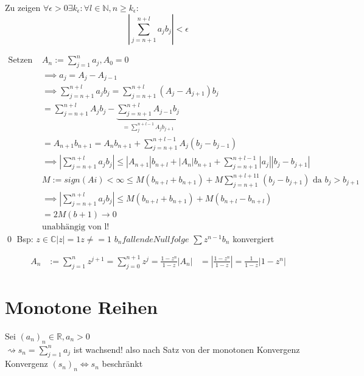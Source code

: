 \documentclass[fleqn]{scrbook}
\newcommand{\R}{\mathbb{R}}
\newcommand{\N}{\mathbb{N}}
\renewenvironment{proof}{{\bfseries Beweis }}{\qed}
\begin{document}
\begin{proof}
 Zu zeigen $\forall \epsilon > 0 \exists k_\epsilon: \forall l \in \N, n \ge k_\epsilon:$
 $$| \sum_{j=n+1}^{n+l} a_j b_j | < \epsilon$$
 
 \begin{equation}
  \begin{split}
    \text{Setzen } & A_n := \sum_{j=1}^{n}a_j, A_0 = 0 \\
    & \implies a_j = A_j - A_{j-1} \\
    & \implies \sum_{j=n+1}^{n+l}  a_j b_j = \sum_{j=n+1}^{n+l} (A_j - A_{j+1}) b_j \\
    & = \sum_{j=n+1}^{n+l}  A_j b_j - \underbrace{\sum_{j=n+1}^{n+l}  A_{j-1} b_j}_{= \sum_j^{n+l-1} A_j b_{j+1}} \\
    & = A_{n+1} b_{n+1} = A_n b_{n+1} + \sum_{j=n+1}^{n+l-1} A_j (b_j - b_{j-1}) \\
    & \implies | \sum_{j=n+1}^{n+l}  a_j b_j | \le | A_{n+1} | b_{n+l} + |A_n| b_{n+1} + \sum_{j=n+1}^{n+l-1} |a_j| |b_j - b_{j+1}|  \\
    & M := sign(Ai) < \infty \le M (b_{n+l} + b_{n+1}) + M \sum_{j=n+1}^{n+l+11} (b_j - b_{j+1})  \text{  da  } b_j > b_{j+1} \\
    & \implies |\sum_{j=n+1}^{n+l} a_j b_j| \le M(b_{n+l} + b_{n+1}) + M (b_{n+l} - b_{n+l}) \\
    & = 2 M(b+1) \to 0 \\
    & \text{unabhängig von l!}
  \end{split}
 \end{equation}
\end{proof}
Bsp: $z \in \mathbb{C} |z| = 1 z \neq = 1$
$b_n fallende Nullfolge$
$\sum z^{n-1} b_n$ konvergiert

\begin{equation}
 \begin{split}
  A_n & := \sum_{j=1}^{n} z^{j+1} = \sum_{j=0}^{n+1}z^j = \frac{1-z^n}{1-z}
  |A_n| & = |\frac{1-z^n}{1-z}| = \frac{1}{1-z} | 1-z^n|
 \end{split}
\end{equation}

\section{Monotone Reihen}
Sei $(a_n)_n \in \R, a_n > 0$ \\
$\rightsquigarrow s_n = \sum_{j=1}^n a_j$ ist wachsend!
also nach Satz von der monotonen Konvergenz
Konvergenz $(s_n)_n \Leftrightarrow s_n$ beschränkt
\end{document}
